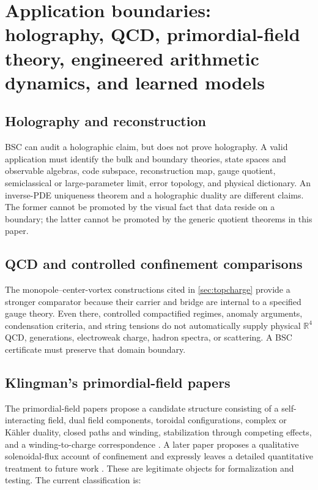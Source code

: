 \documentclass[11pt,a4paper]{article}
\theoremstyle{definition}
\theoremstyle{plain}
\theoremstyle{remark}
\begin{document}
\section{Application boundaries: holography, QCD, primordial-field theory,
engineered arithmetic dynamics, and learned models}\label{sec:applications}

\subsection{Holography and reconstruction}

BSC can audit a holographic claim, but does not prove holography.  A valid
application must identify the bulk and boundary theories, state spaces and
observable algebras, code subspace, reconstruction map, gauge quotient,
semiclassical or large-parameter limit, error topology, and physical
dictionary.  An inverse-PDE uniqueness theorem and a holographic duality are
different claims.  The former cannot be promoted by the visual fact that data
reside on a boundary; the latter cannot be promoted by the generic quotient
theorems in this paper.

\subsection{QCD and controlled confinement comparisons}

The monopole--center-vortex constructions cited in
\cref{sec:topcharge} provide a stronger comparator because their carrier and
bridge are internal to a specified gauge theory.  Even there, controlled
compactified regimes, anomaly arguments, condensation criteria, and string
tensions do not automatically supply physical \(\mathbb R^4\) QCD,
generations, electroweak charge, hadron spectra, or scattering.  A BSC
certificate must preserve that domain boundary.

\subsection{Klingman's primordial-field papers}

The primordial-field papers propose a candidate structure consisting of a
self-interacting field, dual field components, toroidal configurations,
complex or Kähler duality, closed paths and winding, stabilization through
competing effects, and a winding-to-charge correspondence
\citep{klingman2024,klingman2022}.  A later paper proposes a qualitative
solenoidal-flux account of confinement and expressly leaves a detailed
quantitative treatment to future work \citep{klingman2025}.  These are
legitimate objects for formalization and testing.  The current classification
is:
\end{document}
